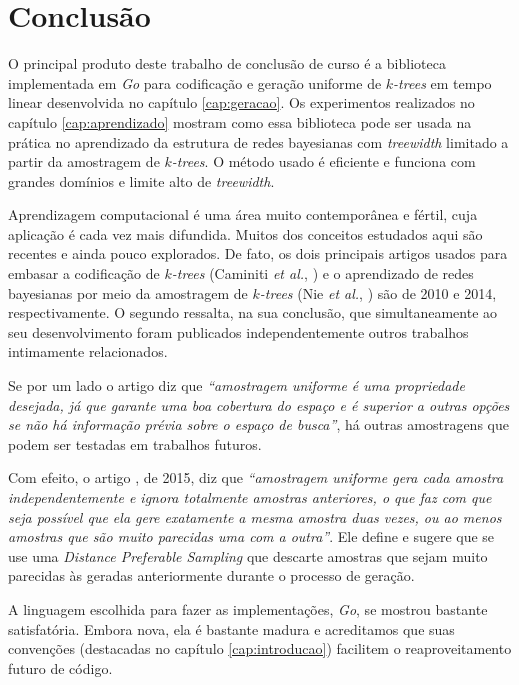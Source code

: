 \chapter{Conclusão}
\label{cap:conclusao}

O principal produto deste trabalho de conclusão de curso é a biblioteca implementada em \emph{Go} para codificação e geração uniforme de \emph{$k$-trees} em tempo linear desenvolvida no capítulo \ref{cap:geracao}. Os experimentos realizados no capítulo \ref{cap:aprendizado} mostram como essa biblioteca pode ser usada na prática no aprendizado da estrutura de redes bayesianas com \emph{treewidth} limitado a partir da amostragem de \emph{$k$-trees}. O método usado é eficiente e funciona com grandes domínios e limite alto de \emph{treewidth}.

Aprendizagem computacional é uma área muito contemporânea e fértil, cuja aplicação é cada vez mais difundida. Muitos dos conceitos estudados aqui são recentes e ainda pouco explorados. De fato, os dois principais artigos usados para embasar a codificação de \emph{$k$-trees} (Caminiti \emph{et al.}, \cite{caminiti}) e o aprendizado de redes bayesianas por meio da amostragem de \emph{$k$-trees} (Nie \emph{et al.}, \cite{maua}) são de 2010 e 2014, respectivamente. O segundo ressalta, na sua conclusão, que simultaneamente ao seu desenvolvimento foram publicados independentemente outros trabalhos intimamente relacionados.

Se por um lado o artigo \cite{maua} diz que \emph{``amostragem uniforme é uma propriedade desejada, já que garante uma boa cobertura do espaço e é superior a outras opções se não há informação prévia sobre o espaço de busca''}, há outras amostragens que podem ser testadas em trabalhos futuros.

Com efeito, o artigo \cite{nie}, de 2015, diz que \emph{``amostragem uniforme gera cada amostra independentemente e ignora totalmente amostras anteriores, o que faz com que seja possível que ela gere exatamente a mesma amostra duas vezes, ou ao menos amostras que são muito parecidas uma com a outra''}. Ele define e sugere que se use uma \emph{Distance Preferable Sampling} que descarte amostras que sejam muito parecidas às geradas anteriormente durante o processo de geração.

A linguagem escolhida para fazer as implementações, \emph{Go}, se mostrou bastante satisfatória. Embora nova, ela é bastante madura e acreditamos que suas convenções (destacadas no capítulo \ref{cap:introducao}) facilitem o reaproveitamento futuro de código.
